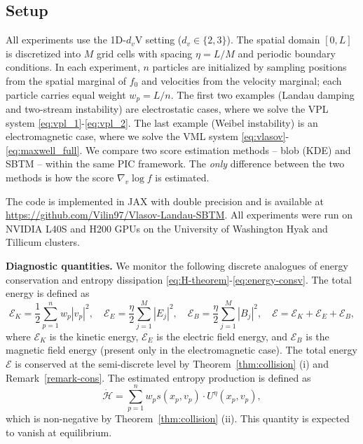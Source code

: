 \documentclass[]{article}
\numberwithin{equation}{section}
\begin{document}
\subsection{Setup}

All experiments use the 1D-$d_v$V setting ($d_v \in \{2, 3\}$).  The spatial domain $[0, L]$ is discretized into $M$ grid cells with spacing $\eta = L / M$ and  periodic boundary conditions. In each experiment, $n$ particles are initialized by sampling positions from the spatial marginal of $f_0$ and velocities from the velocity marginal; each particle carries equal weight $w_p = L/n$. The first two examples (Landau damping and two-stream instability) are electrostatic cases, where we solve the VPL system \eqref{eq:vpl_1}-\eqref{eq:vpl_2}. The last example (Weibel instability) is an electromagnetic case, where we solve the VML system \eqref{eq:vlasov}-\eqref{eq:maxwell_full}. We compare two score estimation methods -- blob (KDE) and SBTM -- within the same PIC framework.  The \emph{only} difference between the two methods is how the score $\nabla_v \log f$ is estimated. 

The code is implemented in JAX \citep{bradbury2018jax} with double precision and is available at \url{https://github.com/Vilin97/Vlasov-Landau-SBTM}.  All experiments were run on NVIDIA L40S and H200 GPUs on the University of Washington Hyak and Tillicum clusters.

\textbf{Diagnostic quantities.}  We monitor the following discrete analogues of energy conservation and entropy dissipation \eqref{eq:H-theorem}-\eqref{eq:energy-consv}. The total energy is defined as
\begin{equation}
\label{eq:diagnostics}
\mathcal{E}_K = \frac{1}{2}\sum_{p=1}^{n} w_p |v_p|^2, \quad
\mathcal{E}_E = \frac{\eta}{2}\sum_{j=1}^{M} |E_j|^2, \quad
\mathcal{E}_B = \frac{\eta}{2}\sum_{j=1}^{M} |B_j|^2, \quad
\mathcal{E} = \mathcal{E}_K + \mathcal{E}_E + \mathcal{E}_B,
\end{equation}
where $\mathcal{E}_K$ is the kinetic energy, $\mathcal{E}_E$ is the electric field energy, and $\mathcal{E}_B$ is the magnetic field energy (present only in the electromagnetic case). The total energy $\mathcal{E}$ is conserved at the semi-discrete level by Theorem~\ref{thm:collision} (i) and Remark~\ref{remark-cons}. The estimated entropy production is defined as
\begin{equation}
\label{eq:entropy_production}
\dot{\mathcal{H}} = \sum_{p=1}^{n}w_p s(x_p, v_p) \cdot U^{\eta}(x_p, v_p),
\end{equation}
which is non-negative by Theorem~\ref{thm:collision} (ii). This quantity is expected to vanish at equilibrium. 
\end{document}

